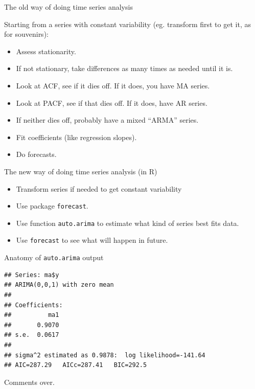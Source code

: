\documentclass[ignorenonframetext,]{beamer}
\newenvironment{Shaded}{\begin{snugshade}}{\end{snugshade}}
\newcommand{\KeywordTok}[1]{\textcolor[rgb]{0.13,0.29,0.53}{\textbf{#1}}}
\newcommand{\NormalTok}[1]{#1}
\newcommand{\OperatorTok}[1]{\textcolor[rgb]{0.81,0.36,0.00}{\textbf{#1}}}
\providecommand{\tightlist}{%
  \setlength{\itemsep}{0pt}\setlength{\parskip}{0pt}}
\begin{document}
\begin{frame}{The old way of doing time series analysis}
\protect\hypertarget{the-old-way-of-doing-time-series-analysis}{}

Starting from a series with constant variability (eg. transform first to
get it, as for souvenirs):

\begin{itemize}
\tightlist
\item
  Assess stationarity.
\item
  If not stationary, take differences as many times as needed until it
  is.
\item
  Look at ACF, see if it dies off. If it does, you have MA series.
\item
  Look at PACF, see if that dies off. If it does, have AR series.
\item
  If neither dies off, probably have a mixed ``ARMA'' series.
\item
  Fit coefficients (like regression slopes).
\item
  Do forecasts.
\end{itemize}

\end{frame}

\begin{frame}[fragile]{The new way of doing time series analysis (in R)}
\protect\hypertarget{the-new-way-of-doing-time-series-analysis-in-r}{}

\begin{itemize}
\tightlist
\item
  Transform series if needed to get constant variability
\item
  Use package \texttt{forecast}.
\item
  Use function \texttt{auto.arima} to estimate what kind of series best
  fits data.
\item
  Use \texttt{forecast} to see what will happen in future.
\end{itemize}

\end{frame}

\begin{frame}[fragile]{Anatomy of \texttt{auto.arima} output}
\protect\hypertarget{anatomy-of-auto.arima-output}{}

\begin{Shaded}
\end{Shaded}

\begin{verbatim}
## Series: ma$y 
## ARIMA(0,0,1) with zero mean 
## 
## Coefficients:
##          ma1
##       0.9070
## s.e.  0.0617
## 
## sigma^2 estimated as 0.9878:  log likelihood=-141.64
## AIC=287.29   AICc=287.41   BIC=292.5
\end{verbatim}

Comments over.

\end{frame}
\end{document}
